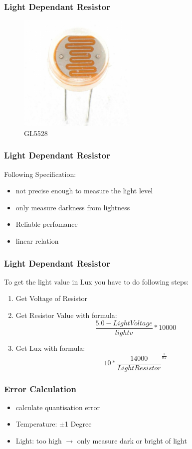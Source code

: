 \documentclass{beamer}
\begin{document}
\frame
{
	\frametitle{Light Dependant Resistor}
		\begin{figure}[h!]
  		\centering
    	\includegraphics[width=0.5\textwidth]{../Images/Light.jpg}
		\caption{GL5528}
	\end{figure}
}

\frame
{
	\frametitle{Light Dependant Resistor}
	Following Specification:
	\begin{itemize}
	\item not precise enough to measure the light level
	\item only measure darkness from lightness
	\item Reliable perfomance
	\item linear relation
	\end{itemize}
}

\frame
{
	\frametitle{Light Dependant Resistor}
	To get the light value in Lux you have to do following steps:
	\begin{enumerate}
	\item Get Voltage of Resistor
	\item Get Resistor Value with formula:
	\begin{equation*}
		\frac{5.0 - Light Voltage}{lightv} * 10000
	\end{equation*}
	\item Get Lux with formula:
	\begin{equation*}
		10*\frac{14000}{Light Resistor}^\frac{1}{0.7}
	\end{equation*}
	\end{enumerate}
}

\frame
{
	\frametitle{Error Calculation}
	\begin{itemize}
	\item calculate quantisation error
	\item Temperature: $\pm$1 Degree
	\item Light: too high $\rightarrow$ only measure dark or bright of light
	\end{itemize}
}
\end{document}
